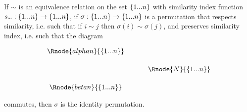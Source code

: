 \documentclass[10pt,a4paper]{scrartcl}
\begin{document}

\begin{lemma}
If $\sim$ is an equivalence relation on the set $\left\{1...n\right\}$ 
with similarity index function $s_\sim: \left\{1...n\right\} \rightarrow \left\{1...n\right\}$, if
$\sigma: \left\{1...n\right\} \rightarrow \left\{1...n\right\}$ is a permutation that respects similarity, i.e. such that
if $i \sim j$ then $\sigma(i) \sim \sigma(j)$, and preserves similarity index, i.e. such that
the diagram
\begin{center}
\begin{equation}
\begin{array}{cp{.5cm}c}
\Rnode{alphan}{\set{\n}}  &&              \\ [0.5cm]
												  && \Rnode{N}{\set{\n}} \\ [0.5cm]
\Rnode{betan}{\set{\n}}   &&            
\end{array}
\end{equation}
\blabel{\sigma}
\end{center}
commutes,
then $\sigma$ is the identity permutation.
\end{lemma}
\end{document}
